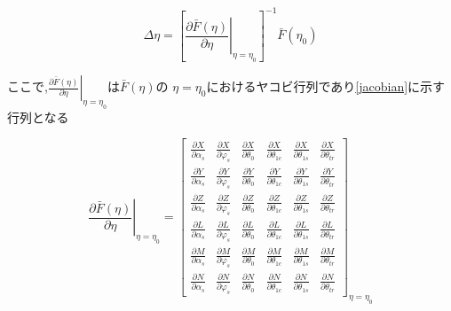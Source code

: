     \begin{equation}
        \Delta \eta=\left[\left.\frac{\partial \bar{F}(\eta)}{\partial \eta}\right|_{\eta=\eta_0}\right]^{-1} \bar{F}\left(\eta_0\right) \label{deltaeta}
    \end{equation}
 

    ここで,$\left.\frac{\partial \bar{F}(\eta)}{\partial \eta}\right|_{\eta=\eta_0}$は$\bar{F}(\eta)$の
    $\eta=\eta_0$におけるヤコビ行列であり\eqref{jacobian}に示す行列となる

   \begin{equation}
            \left.\frac{\partial \bar{F}(\eta)}{\partial \eta}\right|_{\eta=\eta_0}=\left[\begin{array}{cccccc}
            \frac{\partial X}{\partial \alpha_s} & \frac{\partial X}{\partial \varphi_s} & \frac{\partial X}{\partial \theta_0} & \frac{\partial X}{\partial \theta_{1 c}} & \frac{\partial X}{\partial \theta_{1 s}} & \frac{\partial X}{\partial \theta_{t r}} \\
            \frac{\partial Y}{\partial \alpha_s} & \frac{\partial Y}{\partial \varphi_s} & \frac{\partial Y}{\partial \theta_0} & \frac{\partial Y}{\partial \theta_{1 c}} & \frac{\partial Y}{\partial \theta_{1 s}} & \frac{\partial Y}{\partial \theta_{t r}} \\
            \frac{\partial Z}{\partial \alpha_s} & \frac{\partial Z}{\partial \varphi_s} & \frac{\partial Z}{\partial \theta_0} & \frac{\partial Z}{\partial \theta_{1 c}} & \frac{\partial Z}{\partial \theta_{1 s}} & \frac{\partial Z}{\partial \theta_{t r}} \\
            \frac{\partial L}{\partial \alpha_s} & \frac{\partial L}{\partial \varphi_s} & \frac{\partial L}{\partial \theta_0} & \frac{\partial L}{\partial \theta_{1 c}} & \frac{\partial L}{\partial \theta_{1 s}} & \frac{\partial L}{\partial \theta_{t r}} \\
            \frac{\partial M}{\partial \alpha_s} & \frac{\partial M}{\partial \varphi_s} & \frac{\partial M}{\partial \theta_0} & \frac{\partial M}{\partial \theta_{1 c}} & \frac{\partial M}{\partial \theta_{1 s}} & \frac{\partial M}{\partial \theta_{t r}} \\
            \frac{\partial N}{\partial \alpha_s} & \frac{\partial N}{\partial \varphi_s} & \frac{\partial N}{\partial \theta_0} & \frac{\partial N}{\partial \theta_{1 c}} & \frac{\partial N}{\partial \theta_{1 s}} & \frac{\partial N}{\partial \theta_{t r}}
            \end{array}\right]_{\eta=\eta_0}    \label{jacobian}
    \end{equation}

